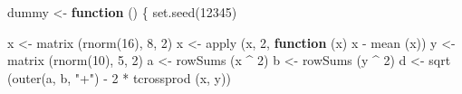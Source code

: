 \documentclass[
  12pt,
]{book}
\newenvironment{Shaded}{\begin{snugshade}}{\end{snugshade}}
\newcommand{\ControlFlowTok}[1]{\textcolor[rgb]{0.13,0.29,0.53}{\textbf{#1}}}
\newcommand{\DecValTok}[1]{\textcolor[rgb]{0.00,0.00,0.81}{#1}}
\newcommand{\FunctionTok}[1]{\textcolor[rgb]{0.00,0.00,0.00}{#1}}
\newcommand{\NormalTok}[1]{#1}
\newcommand{\OtherTok}[1]{\textcolor[rgb]{0.56,0.35,0.01}{#1}}
\newcommand{\SpecialCharTok}[1]{\textcolor[rgb]{0.00,0.00,0.00}{#1}}
\newcommand{\StringTok}[1]{\textcolor[rgb]{0.31,0.60,0.02}{#1}}
\theoremstyle{definition}
\theoremstyle{definition}
\theoremstyle{definition}
\theoremstyle{definition}
\theoremstyle{remark}
\begin{document}
\begin{Shaded}
\begin{Highlighting}[]
\NormalTok{dummy }\OtherTok{\textless{}{-}} \ControlFlowTok{function}\NormalTok{ () \{}
  \FunctionTok{set.seed}\NormalTok{(}\DecValTok{12345}\NormalTok{)}
  
\NormalTok{  x }\OtherTok{\textless{}{-}} \FunctionTok{matrix}\NormalTok{ (}\FunctionTok{rnorm}\NormalTok{(}\DecValTok{16}\NormalTok{), }\DecValTok{8}\NormalTok{, }\DecValTok{2}\NormalTok{)}
\NormalTok{  x }\OtherTok{\textless{}{-}} \FunctionTok{apply}\NormalTok{ (x, }\DecValTok{2}\NormalTok{, }\ControlFlowTok{function}\NormalTok{ (x)}
\NormalTok{    x }\SpecialCharTok{{-}} \FunctionTok{mean}\NormalTok{ (x))}
\NormalTok{  y }\OtherTok{\textless{}{-}} \FunctionTok{matrix}\NormalTok{ (}\FunctionTok{rnorm}\NormalTok{(}\DecValTok{10}\NormalTok{), }\DecValTok{5}\NormalTok{, }\DecValTok{2}\NormalTok{)}
\NormalTok{  a }\OtherTok{\textless{}{-}} \FunctionTok{rowSums}\NormalTok{ (x }\SpecialCharTok{\^{}} \DecValTok{2}\NormalTok{)}
\NormalTok{  b }\OtherTok{\textless{}{-}} \FunctionTok{rowSums}\NormalTok{ (y }\SpecialCharTok{\^{}} \DecValTok{2}\NormalTok{)}
\NormalTok{  d }\OtherTok{\textless{}{-}} \FunctionTok{sqrt}\NormalTok{ (}\FunctionTok{outer}\NormalTok{(a, b, }\StringTok{"+"}\NormalTok{) }\SpecialCharTok{{-}} \DecValTok{2} \SpecialCharTok{*} \FunctionTok{tcrossprod}\NormalTok{ (x, y))}
  

\end{Highlighting}
\end{Shaded}
\end{document}
